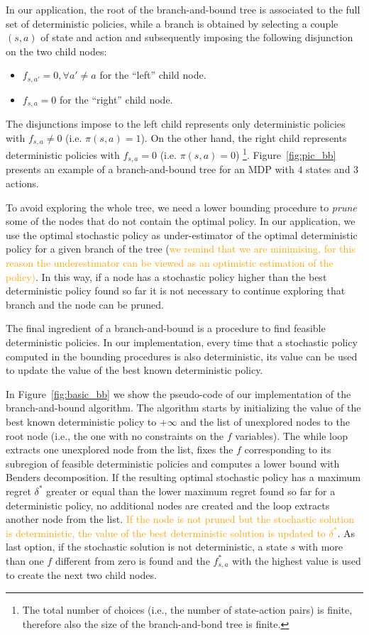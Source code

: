 \documentclass[sigconf]{aamas}  %
\newcommand{\PA}[1]{{\textcolor{orange}{#1}}}
\begin{document}
In our application, the root of the branch-and-bound tree is associated to the full set of deterministic policies, while a branch is obtained by selecting a couple $(s,a)$ of state and action and subsequently imposing the following disjunction on the two child nodes:
\begin{itemize}
\item $f_{s,a'}=0, \forall a'\neq a$ for the ``left'' child node.
\item $f_{s,a}=0$ for the ``right'' child node. 
\end{itemize} 
The disjunctions impose to the left child represents only deterministic policies with $f_{s,a}\neq 0$  (i.e. $\pi(s,a)=1$). On the other hand, the right child represents deterministic policies with $f_{s,a}=0$  (i.e. $\pi(s,a)=0$)
\footnote{The total number of choices (i.e., the number of state-action pairs) is finite, therefore also the size of the branch-and-bond tree is finite.}. Figure~\ref{fig:pic_bb} presents an example of a branch-and-bound tree for an MDP with $4$ states and $3$ actions. 
 

To avoid exploring the whole tree, we need a lower bounding procedure to \textit{prune} some of the nodes that do not contain the optimal policy. In our application, we use the optimal stochastic policy as under-estimator of the optimal deterministic policy for a given branch of the tree (\PA{we remind that we are minimising, for this reason the underestimator can be viewed as an optimistic estimation of the policy)}. In this way, if a node has a stochastic policy higher than the best deterministic policy found so far it is not necessary to continue exploring that branch and the node can be pruned.

The final ingredient of a branch-and-bound is a procedure to find feasible deterministic policies. In our implementation, every time that a stochastic policy computed in the bounding procedures is also deterministic, its value can be used to update the value of the best known deterministic policy. %


In Figure~\ref{fig:basic_bb} we show the pseudo-code of our implementation of the branch-and-bound algorithm. The algorithm starts by initializing the value of the best known deterministic policy to $+\infty$ and the list of unexplored nodes to the root node (i.e., the one with no constraints on the $f$ variables).
The while loop extracts one unexplored node from the list, fixes the $f$ corresponding to its subregion of feasible deterministic policies and computes a lower bound with Benders decomposition. If the resulting optimal stochastic policy has a maximum regret $\delta^*$ greater or equal than the lower maximum regret found so far for a deterministic policy, no additional nodes are created and the loop extracts another node from the list. \PA{If the node is not pruned but the stochastic solution is deterministic, the value of the best deterministic solution is updated to $\delta^*$}. As last option, if the stochastic solution is not deterministic, a state $s$ with more than one $f$ different from zero is found and the $f^*_{s,a}$ with the highest value is used to create the next two child nodes.
\end{document}
